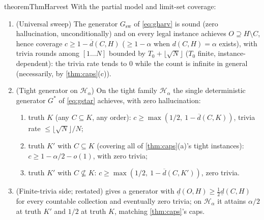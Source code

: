 \documentclass[11pt]{article}
\numberwithin{equation}{section}
\newcommand{\mc}[1]{\mathcal{#1}}
\newcommand{\Val}{H}
\newcommand{\Hcal}{\mc{H}}
\newcommand{\Hfam}{\Hcal_{\alpha}}
\newcommand{\Out}{O}
\newcommand{\Core}{C}
\newcommand{\dlow}[2]{\underline{d}(#1,#2)}
\newcommand{\dup}[2]{\overline{d}(#1,#2)}
\newcommand{\dens}[2]{d(#1,#2)}
\newcommand{\cov}{c}
\theoremstyle{plain}
\theoremstyle{definition}
\theoremstyle{remark}
\begin{document}
\begin{restatable}{theorem}{ThmHarvest}\label{thm:harvest}
With the partial model and limit-set coverage:
\begin{enumerate}[label=\textup{(\roman*)}]
  \item \textup{(Universal sweep)} The generator $G_{\mathrm{sw}}$ of \eqref{eq:gharv} is
    sound (zero hallucination, unconditionally) and on every legal instance achieves $\Out
    \supseteq \Val \setminus \Core$, hence coverage $\cov \ge 1 - \dup{\Core}{\Val}$ ($\ge 1 -
    \alpha$ when $\dens{\Core}{\Val} = \alpha$ exists), with trivia rounds among $[1\dots N]$
    bounded by $T_0 + \lfloor \sqrt N \rfloor$ ($T_0$ finite, instance-dependent): the trivia
    rate tends to $0$ while the count is infinite in general (necessarily, by
    \cref{thm:caps}(c)).
  \item \textup{(Tight generator on $\Hfam$)} On the tight family $\Hfam$ the single
    deterministic generator $G^*$ of \eqref{eq:gstar} achieves, with zero hallucination:
    \begin{enumerate}[label=\textup{(\alph*)}]
  \item truth $K$ (any $\Core \subseteq K$, any order): $\cov \ge \max(1/2,\ 1 -
    \dup{\Core}{K})$, trivia rate $\le \lfloor \sqrt N \rfloor / N$;
  \item truth $K'$ with $\Core \subseteq K$ (covering all of \cref{thm:caps}(a)'s tight
    instances): $\cov \ge 1 - \alpha/2 - o(1)$, with zero trivia;
  \item truth $K'$ with $\Core \not\subseteq K$: $\cov \ge \max(1/2,\ 1 - \dup{\Core}{K'})$,
    zero trivia.
    \end{enumerate}
  \item \textup{(Finite-trivia side; restated)}  gives a generator with
    $\dlow{\Out}{\Val} \ge \tfrac12 \dlow{\Core}{\Val}$ for every countable collection and
    eventually zero trivia; on $\Hfam$ it attains $\alpha/2$ at truth $K'$ and $1/2$ at truth
    $K$, matching \cref{thm:caps}'s caps.
\end{enumerate}
\end{restatable}
\end{document}
